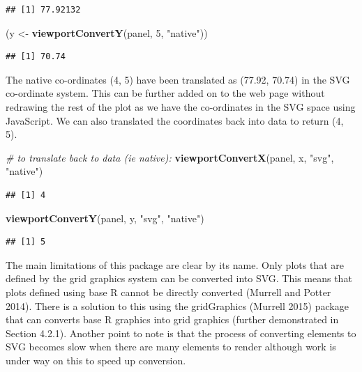 \documentclass[11pt,]{report}
\newenvironment{Shaded}{\begin{snugshade}}{\end{snugshade}}
\newcommand{\KeywordTok}[1]{\textcolor[rgb]{0.13,0.29,0.53}{\textbf{#1}}}
\newcommand{\DecValTok}[1]{\textcolor[rgb]{0.00,0.00,0.81}{#1}}
\newcommand{\StringTok}[1]{\textcolor[rgb]{0.31,0.60,0.02}{#1}}
\newcommand{\CommentTok}[1]{\textcolor[rgb]{0.56,0.35,0.01}{\textit{#1}}}
\newcommand{\NormalTok}[1]{#1}
\begin{document}
\begin{verbatim}
## [1] 77.92132
\end{verbatim}

\begin{Shaded}
\begin{Highlighting}[]
\NormalTok{(y <-}\StringTok{ }\KeywordTok{viewportConvertY}\NormalTok{(panel, }\DecValTok{5}\NormalTok{, }\StringTok{"native"}\NormalTok{))}
\end{Highlighting}
\end{Shaded}

\begin{verbatim}
## [1] 70.74
\end{verbatim}

The native co-ordinates (4, 5) have been translated as (77.92, 70.74) in
the SVG co-ordinate system. This can be further added on to the web page
without redrawing the rest of the plot as we have the co-ordinates in
the SVG space using JavaScript. We can also translated the coordinates
back into data to return (4, 5).

\begin{Shaded}
\begin{Highlighting}[]
\CommentTok{# to translate back to data (ie native):}
\KeywordTok{viewportConvertX}\NormalTok{(panel, x, }\StringTok{"svg"}\NormalTok{, }\StringTok{"native"}\NormalTok{)}
\end{Highlighting}
\end{Shaded}

\begin{verbatim}
## [1] 4
\end{verbatim}

\begin{Shaded}
\begin{Highlighting}[]
\KeywordTok{viewportConvertY}\NormalTok{(panel, y, }\StringTok{"svg"}\NormalTok{, }\StringTok{"native"}\NormalTok{)}
\end{Highlighting}
\end{Shaded}

\begin{verbatim}
## [1] 5
\end{verbatim}

The main limitations of this package are clear by its name. Only plots
that are defined by the \textsf{grid} graphics system can be converted
into SVG. This means that plots defined using base R cannot be directly
converted (Murrell and Potter 2014). There is a solution to this using
the \textsf{gridGraphics} (Murrell 2015) package that can converts base
R graphics into \textsf{grid} graphics (further demonstrated in Section
4.2.1). Another point to note is that the process of converting elements
to SVG becomes slow when there are many elements to render although work
is under way on this to speed up conversion.
\end{document}
